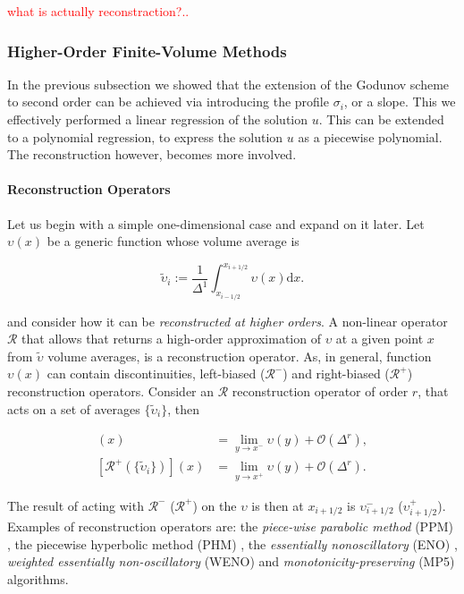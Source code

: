 \textcolor{red}{what is actually reconstraction?..}


\subsubsection{Higher-Order Finite-Volume Methods}


In the previous subsection we showed that the extension of the Godunov scheme to second order can be achieved via introducing the profile $\sigma_i$, or a slope. 
This we effectively performed a linear regression of the solution $u$. 
This can be extended to a polynomial regression, to express the solution $u$ as a piecewise polynomial. 
The reconstruction however, becomes more involved.


\paragraph{Reconstruction Operators}


Let us begin with a simple one-dimensional case and expand on it later. 
Let $\upsilon(x)$ be a generic function whose volume average is 

\begin{equation}
\widetilde{\upsilon}_i := \frac{1}{\Delta^1}\int_{x_{i-1/2}}^{x_{i+1/2}}\upsilon(x)\text{d}x.
\end{equation}

and consider how it can be \textit{reconstructed at higher orders}. 
A non-linear operator  $\mathcal{R}$ that allows that returns a high-order approximation of $\upsilon$ at a given point $x$ from $\widetilde{\upsilon}$ volume averages, is a reconstruction operator. 
As, in general, function $\upsilon(x)$ can contain discontinuities, left-biased ($\mathcal{R}^-$) and right-biased ($\mathcal{R}^+$) reconstruction operators.
Consider an $\mathcal{R}$ reconstruction operator of order $r$, that acts on a set of averages $\{\widetilde{\upsilon}_i\}$, then

\begin{align}
[\mathcal{R}^{-}(\{\widetilde{\upsilon}_{i}\})](x) &= \lim_{y\rightarrow x^{-}} \upsilon(y) + \mathcal{O}(\Delta^r), \\
[\mathcal{R}^{+}(\{\widetilde{\upsilon}_{i}\})](x) &= \lim_{y\rightarrow x^{+}} \upsilon(y) + \mathcal{O}(\Delta^r).
\end{align}

The result of acting with $\mathcal{R}^-$ ($\mathcal{R}^+$) on the $\upsilon$ is then at $x_{i+1/2}$ is $\upsilon^{-}_{i+1/2}$ ($\upsilon^{+}_{i+1/2}$). 
Examples of reconstruction operators are: 
the \textit{piece-wise parabolic method} (PPM) \cite{Colella:1984,Colella:2008}, the piecewise hyperbolic method (PHM) \cite{Marquina:1994}, 
the \textit{essentially nonoscillatory} (ENO) \cite{Harten:1987,Shu:1988,Shu:1989}, 
\textit{weighted essentially non-oscillatory} (WENO) \cite{Liu:1994,Jiang:1996} 
and \textit{monotonicity-preserving} (MP5) \cite{Suresh:1997} algorithms. 

